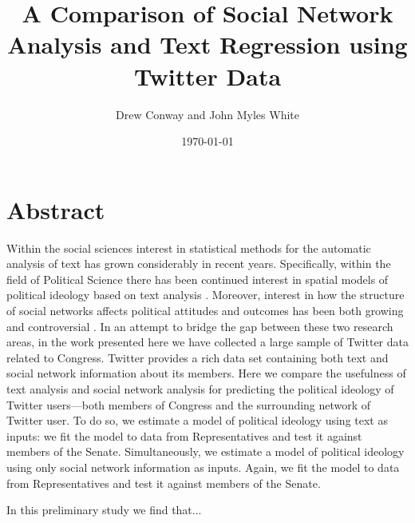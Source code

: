 \documentclass[11pt]{article}
\title{A Comparison of Social Network Analysis and Text Regression using Twitter Data}
\author{Drew Conway and John Myles White}
\date{\today}
\begin{document}
\maketitle

\section{Abstract}
Within the social sciences interest in statistical methods for the automatic analysis of text has grown considerably in recent years.  Specifically, within the field of Political Science there has been continued interest in spatial models of political ideology based on text analysis \citep{Grimmer_2011, Monroe_2008, Laver_2003}.  Moreover, interest in how the structure of social networks affects political attitudes and outcomes has been both growing \citep{Siegel_2009, Burton_2009} and controversial \citep{Fowler_2010, Lyons_2010}.  In an attempt to bridge the gap between these two research areas, in the work presented here we have collected a large sample of Twitter data related to Congress. Twitter provides a rich data set containing both text and social network information about its members. Here we compare the usefulness of text analysis and social network analysis for predicting the political ideology of Twitter users---both members of Congress and the surrounding network of Twitter user. To do so, we estimate a model of political ideology using text as inputs: we fit the model to data from Representatives and test it against members of the Senate. Simultaneously, we estimate a model of political ideology using only social network information as inputs.  Again, we fit the model to data from Representatives and test it against members of the Senate. 

In this preliminary study we find that...
\end{document}
